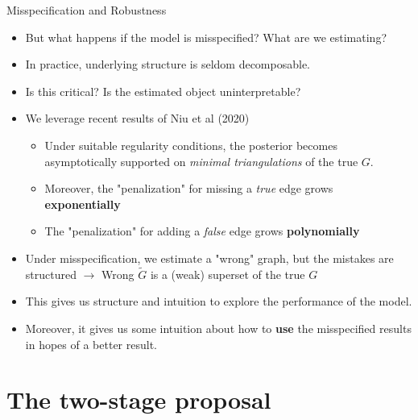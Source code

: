 \begin{frame}{Misspecification and Robustness}
\begin{itemize}
    \item But what happens if the model is misspecified? What are we estimating?
    \item In practice, underlying structure is seldom decomposable.
    \item Is this critical? Is the estimated object uninterpretable?
    \item We leverage recent results of Niu et al (2020)
    \begin{itemize}
        \item Under suitable regularity conditions, the posterior becomes asymptotically supported on \textit{minimal triangulations} of the true $G$.
        \item Moreover, the "penalization" for missing a \textit{true} edge grows \textbf{exponentially} 
        \item The "penalization" for adding a \textit{false} edge grows \textbf{polynomially}
    \end{itemize}
    \item Under misspecification, we estimate a "wrong" graph, but the mistakes are structured $\rightarrow$ Wrong $\tilde G$ is a (weak) superset of the true $G$
    \item This gives us structure and intuition to explore the performance of the model.
    \item Moreover, it gives us some intuition about how to \textbf{use} the misspecified results in hopes of a better result.
\end{itemize}
\end{frame}


\section{The two-stage proposal}

